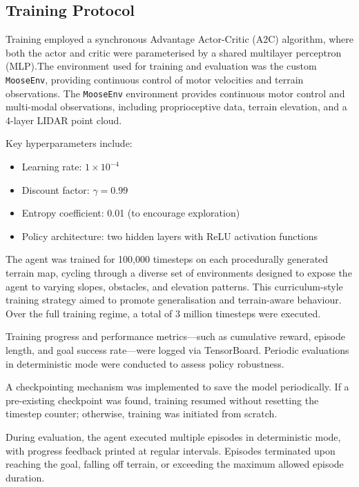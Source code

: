 \documentclass[conference]{IEEEtran}
\begin{document}
\subsection{Training Protocol}

Training employed a synchronous Advantage Actor-Critic (A2C) algorithm, where both the actor and critic were parameterised by a shared multilayer perceptron (MLP).The environment used for training and evaluation was the custom \texttt{MooseEnv}, providing continuous control of motor velocities and terrain observations.
The \texttt{MooseEnv} environment provides continuous motor control and multi-modal observations, including proprioceptive data, terrain elevation, and a 4-layer LIDAR point cloud.

Key hyperparameters include:
\begin{itemize}
    \item Learning rate: \(1 \times 10^{-4}\)
    \item Discount factor: \(\gamma = 0.99\)
    \item Entropy coefficient: 0.01 (to encourage exploration)
    \item Policy architecture: two hidden layers with ReLU activation functions
\end{itemize}

The agent was trained for 100{,}000 timesteps on each procedurally generated terrain map, cycling through a diverse set of environments designed to expose the agent to varying slopes, obstacles, and elevation patterns. This curriculum-style training strategy aimed to promote generalisation and terrain-aware behaviour. Over the full training regime, a total of 3 million timesteps were executed.

Training progress and performance metrics—such as cumulative reward, episode length, and goal success rate—were logged via TensorBoard. Periodic evaluations in deterministic mode were conducted to assess policy robustness.

A checkpointing mechanism was implemented to save the model periodically. If a pre-existing checkpoint was found, training resumed without resetting the timestep counter; otherwise, training was initiated from scratch.

During evaluation, the agent executed multiple episodes in deterministic mode, with progress feedback printed at regular intervals. Episodes terminated upon reaching the goal, falling off terrain, or exceeding the maximum allowed episode duration.
\end{document}
